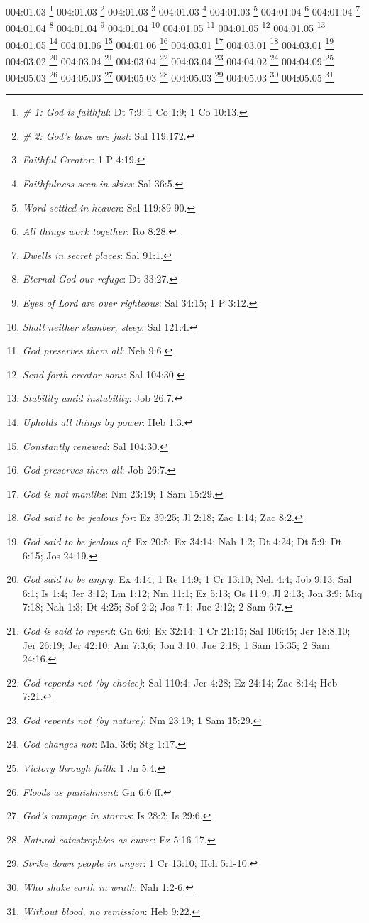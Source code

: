 {004:01.03 \footnote{\textit{# 1: God is faithful}: Dt 7:9; 1 Co 1:9; 1 Co 10:13.}
004:01.03 \footnote{\textit{# 2: God's laws are just}: Sal 119:172.}
004:01.03 \footnote{\textit{Faithful Creator}: 1 P 4:19.}
004:01.03 \footnote{\textit{Faithfulness seen in skies}: Sal 36:5.}
004:01.03 \footnote{\textit{Word settled in heaven}: Sal 119:89-90.}
004:01.04 \footnote{\textit{All things work together}: Ro 8:28.}
004:01.04 \footnote{\textit{Dwells in secret places}: Sal 91:1.}
004:01.04 \footnote{\textit{Eternal God our refuge}: Dt 33:27.}
004:01.04 \footnote{\textit{Eyes of Lord are over righteous}: Sal 34:15; 1 P 3:12.}
004:01.04 \footnote{\textit{Shall neither slumber, sleep}: Sal 121:4.}
004:01.05 \footnote{\textit{God preserves them all}: Neh 9:6.}
004:01.05 \footnote{\textit{Send forth creator sons}: Sal 104:30.}
004:01.05 \footnote{\textit{Stability amid instability}: Job 26:7.}
004:01.05 \footnote{\textit{Upholds all things by power}: Heb 1:3.}
004:01.06 \footnote{\textit{Constantly renewed}: Sal 104:30.}
004:01.06 \footnote{\textit{God preserves them all}: Job 26:7.}
004:03.01 \footnote{\textit{God is not manlike}: Nm 23:19; 1 Sam 15:29.}
004:03.01 \footnote{\textit{God said to be jealous for}: Ez 39:25; Jl 2:18; Zac 1:14; Zac 8:2.}
004:03.01 \footnote{\textit{God said to be jealous of}: Ex 20:5; Ex 34:14; Nah 1:2; Dt 4:24; Dt 5:9; Dt 6:15; Jos 24:19.}
004:03.02 \footnote{\textit{God said to be angry}: Ex 4:14; 1 Re 14:9; 1 Cr 13:10; Neh 4:4; Job 9:13; Sal 6:1; Is 1:4; Jer 3:12; Lm 1:12; Nm 11:1; Ez 5:13; Os 11:9; Jl 2:13; Jon 3:9; Miq 7:18; Nah 1:3; Dt 4:25; Sof 2:2; Jos 7:1; Jue 2:12; 2 Sam 6:7.}
004:03.04 \footnote{\textit{God is said to repent}: Gn 6:6; Ex 32:14; 1 Cr 21:15; Sal 106:45; Jer 18:8,10; Jer 26:19; Jer 42:10; Am 7:3,6; Jon 3:10; Jue 2:18; 1 Sam 15:35; 2 Sam 24:16.}
004:03.04 \footnote{\textit{God repents not (by choice)}: Sal 110:4; Jer 4:28; Ez 24:14; Zac 8:14; Heb 7:21.}
004:03.04 \footnote{\textit{God repents not (by nature)}: Nm 23:19; 1 Sam 15:29.}
004:04.02 \footnote{\textit{God changes not}: Mal 3:6; Stg 1:17.}
004:04.09 \footnote{\textit{Victory through faith}: 1 Jn 5:4.}
004:05.03 \footnote{\textit{Floods as punishment}: Gn 6:6 ff.}
004:05.03 \footnote{\textit{God's rampage in storms}: Is 28:2; Is 29:6.}
004:05.03 \footnote{\textit{Natural catastrophies as curse}: Ez 5:16-17.}
004:05.03 \footnote{\textit{Strike down people in anger}: 1 Cr 13:10; Hch 5:1-10.}
004:05.03 \footnote{\textit{Who shake earth in wrath}: Nah 1:2-6.}
004:05.05 \footnote{\textit{Without blood, no remission}: Heb 9:22.}

}
